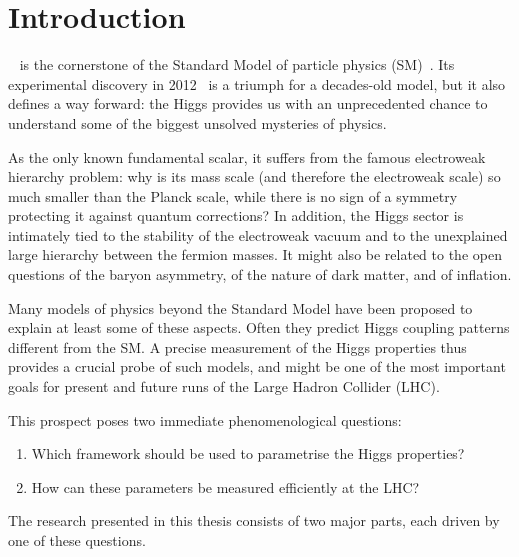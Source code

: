 

\chapter{Introduction}
\label{chapter:Introduction}

~\cite{Higgs:1964ia, Higgs:1964pj,
  Englert:1964et, Guralnik:1964eu, Higgs:1966ev} is the cornerstone
of the Standard Model of particle physics (SM)~\cite{Glashow:1961tr,
  Weinberg:1967tq, Salam:1968rm}. Its experimental discovery in
2012~\cite{Aad:2012tfa, Chatrchyan:2012xdj}
%
%
%
is a triumph for a decades-old model, but it also defines a way
forward: the Higgs provides us with an unprecedented chance to
understand some of the biggest unsolved mysteries of physics.

As the only known fundamental scalar, it suffers from the famous
electroweak hierarchy problem: why is its mass scale (and therefore
the electroweak scale) so much smaller than the Planck scale, while
there is no sign of a symmetry protecting it against quantum
corrections? In addition, the Higgs sector is intimately tied to the
stability of the electroweak vacuum and to the unexplained large
hierarchy between the fermion masses. It might also be related to
the open questions of the baryon asymmetry, of the nature of dark
matter, and of inflation.

Many models of physics beyond the Standard Model have been proposed to
explain at least some of these aspects. Often they predict Higgs
coupling patterns different from the SM. A precise measurement of
the Higgs properties thus provides a crucial probe of such models, and
might be one of the most important goals for present and future
runs of the Large Hadron Collider (LHC).

This prospect poses two immediate phenomenological questions:
%
\begin{enumerate}
\item Which framework should be used to parametrise the Higgs
  properties?
\item How can these parameters be measured efficiently at the LHC?
\end{enumerate}
%
%
The research presented in this thesis consists of two major parts,
each driven by one of these questions.
%

